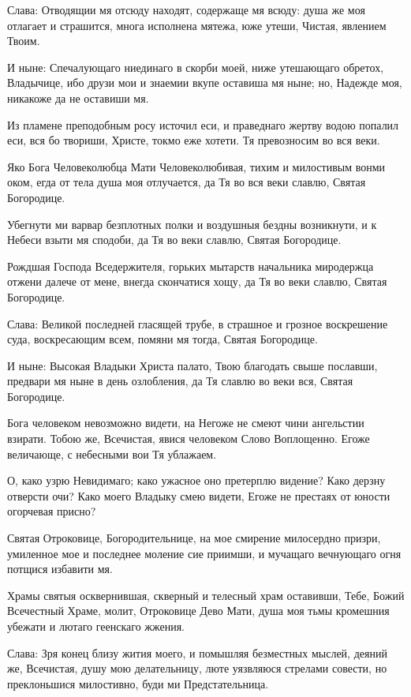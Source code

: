 \begin{mymulticols}
Слава: Отводящии мя отсюду находят, содержаще мя всюду: душа же моя отлагает и страшится, многа исполнена мятежа, юже утеши, Чистая, явлением Твоим. 

И ныне: Спечалующаго ниединаго в скорби моей, ниже утешающаго обретох, Владычице, ибо друзи мои и знаемии вкупе оставиша мя ныне; но, Надежде моя, никакоже да не оставиши мя.




 Из пламене преподобным росу источил еси, и праведнаго жертву водою попалил еси, вся бо твориши, Христе, токмо еже хотети. Тя превозносим во вся веки. 

Яко Бога Человеколюбца Мати Человеколюбивая, тихим и милостивым вонми оком, егда от тела душа моя отлучается, да Тя во вся веки славлю, Святая Богородице. 

Убегнути ми варвар безплотных полки и воздушныя бездны возникнути, и к Небеси взыти мя сподоби, да Тя во веки славлю, Святая Богородице. 

Рождшая Господа Вседержителя, горьких мытарств начальника миродержца отжени далече от мене, внегда скончатися хощу, да Тя во веки славлю, Святая Богородице. 

Слава: Великой последней гласящей трубе, в страшное и грозное воскрешение суда, воскресающим всем, помяни мя тогда, Святая Богородице. 

И ныне: Высокая Владыки Христа палато, Твою благодать свыше пославши, предвари мя ныне в день озлобления, да Тя славлю во веки вся, Святая Богородице.




Бога человеком невозможно видети, на Негоже не смеют чини ангельстии взирати. Тобою же, Всечистая, явися человеком Слово Воплощенно. Егоже величающе, с небесными вои Тя ублажаем. 

О, како узрю Невидимаго; како ужасное оно претерплю видение? Како дерзну отверсти очи? Како моего Владыку смею видети, Егоже не престаях от юности огорчевая присно? 

Святая Отроковице, Богородительнице, на мое смирение милосердно призри, умиленное мое и последнее моление сие приимши, и мучащаго вечнующаго огня потщися избавити мя. 

Храмы святыя осквернившая, скверный и телесный храм оставивши, Тебе, Божий Всечестный Храме, молит, Отроковице Дево Мати, душа моя тьмы кромешния убежати и лютаго геенскаго жжения. 

Слава: Зря конец близу жития моего, и помышляя безместных мыслей, деяний же, Всечистая, душу мою делательницу, люте уязвляюся стрелами совести, но преклоньшися милостивно, буди ми Предстательница. 


\end{mymulticols}
